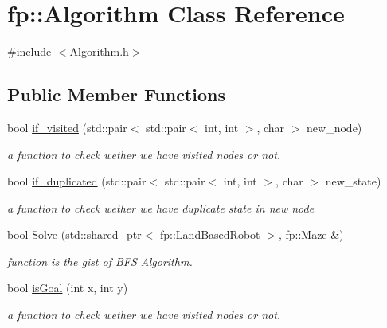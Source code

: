 \hypertarget{classfp_1_1_algorithm}{}\section{fp\+:\+:Algorithm Class Reference}
\label{classfp_1_1_algorithm}


{\ttfamily \#include $<$Algorithm.\+h$>$}

\subsection*{Public Member Functions}
\begin{DoxyCompactItemize}
\item 
bool \hyperlink{classfp_1_1_algorithm_aa7083be9be18b81bedf9bcc9976e97af}{if\+\_\+visited} (std\+::pair$<$ std\+::pair$<$ int, int $>$, char $>$ new\+\_\+node)
\begin{DoxyCompactList}\small\item\em a function to check wether we have visited nodes or not. \end{DoxyCompactList}\item 
bool \hyperlink{classfp_1_1_algorithm_a92571327e87248eb1afc706d571e47e0}{if\+\_\+duplicated} (std\+::pair$<$ std\+::pair$<$ int, int $>$, char $>$ new\+\_\+state)
\begin{DoxyCompactList}\small\item\em a function to check wether we have duplicate state in new node \end{DoxyCompactList}\item 
bool \hyperlink{classfp_1_1_algorithm_a2e66300e1507ff3f71d5fbbffede52a3}{Solve} (std\+::shared\+\_\+ptr$<$ \hyperlink{classfp_1_1_land_based_robot}{fp\+::\+Land\+Based\+Robot} $>$, \hyperlink{classfp_1_1_maze}{fp\+::\+Maze} \&)
\begin{DoxyCompactList}\small\item\em function is the gist of B\+FS \hyperlink{classfp_1_1_algorithm}{Algorithm}. \end{DoxyCompactList}\item 
bool \hyperlink{classfp_1_1_algorithm_a237fc28eed2899786cd06f4e5a0e7333}{is\+Goal} (int x, int y)
\begin{DoxyCompactList}\small\item\em a function to check wether we have visited nodes or not. \end{DoxyCompactList}\end{DoxyCompactItemize}


